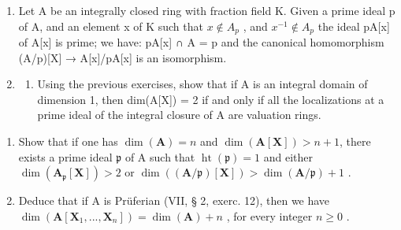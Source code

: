 \begin{enumerate}
\def\labelenumi{\arabic{enumi})}
\setcounter{enumi}{4}
\item
  Let A be an integrally closed ring with fraction field K. Given a prime ideal p of A, and an element x of K such that \(x \notin A_{p}\) , and \(x^{-1} \notin A_{p}\) the ideal pA{[}x{]} of A{[}x{]} is prime; we have: pA{[}x{]} ∩ A = p and the canonical homomorphism (A/p){[}X{]} → A{[}x{]}/pA{[}x{]} is an isomorphism.
\item
  \begin{enumerate}
  \def\labelenumii{\alph{enumii})}
  \tightlist
  \item
    Using the previous exercises, show that if A is an integral domain of dimension 1, then dim(A{[}X{]}) = 2 if and only if all the localizations at a prime ideal of the integral closure of A are valuation rings.
  \end{enumerate}
\end{enumerate}

\begin{enumerate}
\def\labelenumi{\alph{enumi})}
\setcounter{enumi}{1}
\tightlist
\item
  Show that if one has \(\dim(\mathbf{A}) = n\) and \(\dim(\mathbf{A}[\mathbf{X}]) > n + 1\), there exists a prime ideal \(\mathfrak{p}\) of A such that \(\operatorname{ht}(\mathfrak{p}) = 1\) and either \(\dim(\mathbf{A}_{\mathfrak{p}}[\mathbf{X}]) > 2\) or \(\dim((\mathbf{A}/\mathfrak{p})[\mathbf{X}]) > \dim(\mathbf{A}/\mathfrak{p}) + 1\) .
\item
  Deduce that if A is Prüferian (VII, § 2, exerc. 12), then we have \(\dim(\mathbf{A}[\mathbf{X}_1, ..., \mathbf{X}_n]) = \dim(\mathbf{A}) + n\) , for every integer \(n \geqslant 0\) .
\end{enumerate}

